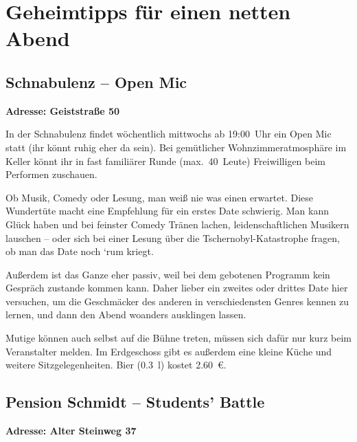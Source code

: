\section{Geheimtipps für einen netten Abend}

\begin{multicols}{2}
\subsection*{Schnabulenz -- Open Mic}
\textbf{Adresse: Geiststraße 50}

\begin{center}
\end{center}

In der Schnabulenz findet wöchentlich mittwochs ab 19:00~Uhr ein Open Mic statt (ihr könnt ruhig eher da sein). Bei gemütlicher Wohnzimmeratmosphäre im Keller könnt ihr in fast familiärer Runde (max.\ 40~Leute) Freiwilligen beim Performen zuschauen.

Ob Musik, Comedy oder Lesung, man weiß nie was einen erwartet. Diese Wundertüte macht eine Empfehlung für ein erstes Date schwierig. Man kann Glück haben und bei feinster Comedy Tränen lachen, leidenschaftlichen Musikern lauschen -- oder sich bei einer Lesung über die Tschernobyl-Katastrophe fragen, ob man das Date noch `rum kriegt.

Außerdem ist das Ganze eher passiv, weil bei dem gebotenen Programm kein Gespräch zustande kommen kann. Daher lieber ein zweites oder drittes Date hier versuchen, um die Geschmäcker des anderen in verschiedensten Genres kennen zu lernen, und dann den Abend woanders ausklingen lassen.

Mutige können auch selbst auf die Bühne treten, müssen sich dafür nur kurz beim Veranstalter melden. Im Erdgeschoss gibt es außerdem eine kleine Küche und weitere Sitzgelegenheiten. Bier (\SI{0,3}{\l}) kostet \SI{2,60}{€}.

\vspace{\fill}

\columnbreak

\subsection*{Pension Schmidt -- Students' Battle}
\textbf{Adresse: Alter Steinweg 37}

\begin{center}
\vspace{-1.2mm}
\end{center}


\end{multicols}
